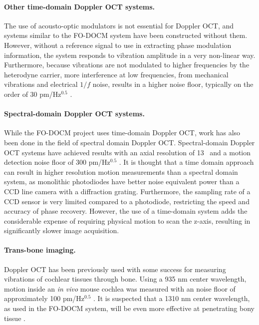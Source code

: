 \paragraph{Other time-domain Doppler OCT systems.} The use of acousto-optic modulators is not essential for Doppler OCT, and systems similar to the FO-DOCM system have been constructed without them. However, without a reference signal to use in extracting phase modulation information, the system responds to vibration amplitude in a very non-linear way. Furthermore, because vibrations are not modulated to higher frequencies by the heterodyne carrier, more interference at low frequencies, from mechanical vibrations and electrical $1/f$ noise, results in a higher noise floor, typically on the order of 30 pm/Hz$^{0.5}$ \cite{Choudhury2006}.

\paragraph{Spectral-domain Doppler OCT systems.} While the FO-DOCM project uses time-domain Doppler OCT, work has also been done in the field of spectral domain Doppler OCT. Spectral-domain Doppler OCT systems have achieved results with an axial resolution of 13 \micron~and a motion detection noise floor of 300 pm/Hz$^{0.5}$ \cite{Choudhury2011} \cite{Subhash2012}. It is thought that a time domain approach can result in higher resolution motion measurements than a spectral domain system, as monolithic photodiodes have better noise equivalent power than a CCD line camera with a diffraction grating. Furthermore, the sampling rate of a CCD sensor is very limited compared to a photodiode, restricting the speed and accuracy of phase recovery. However, the use of a time-domain system adds the considerable expense of requiring physical motion to scan the z-axis, resulting in significantly slower image acquisition.

\paragraph{Trans-bone imaging.} Doppler OCT has been previously used with some success for measuring vibrations of cochlear tissues through bone. Using a 935 nm center wavelength, motion inside an {\em in vivo} mouse cochlea was measured with an noise floor of approximately 100 pm/Hz$^{0.5}$ \cite{Gao2013}. It is suspected that a 1310 nm center wavelength, as used in the FO-DOCM system, will be even more effective at penetrating bony tissue \cite{Sandell2011} \cite{Bashkatov2006}. 

